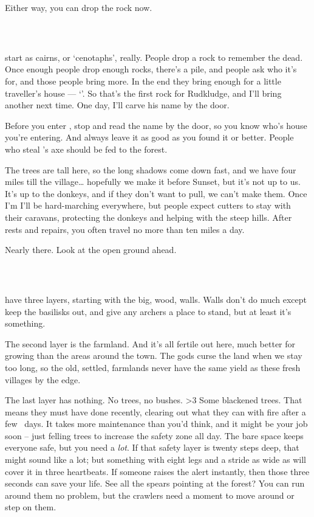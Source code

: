 Either way, you can drop the rock now.

\subsubsection{~}
start as cairns, or `cenotaphs', really.
People drop a rock to remember the dead.
Once enough people drop enough rocks, there's a pile, and people ask who it's for, and those people bring more.
In the end they bring enough for a little traveller's house --- `'.
So that's the first rock for Rudkludge, and I'll bring another next time.
One day, I'll carve his name by the door.

Before you enter , stop and read the name by the door, so you know who's house you're entering.
And always leave it as good as you found it or better.
People who steal 's axe should be fed to the forest.

The trees are tall here, so the long shadows come down fast, and we have four miles till the \gls{village}\ldots
hopefully we make it before Sunset, but it's not up to us.
It's up to the donkeys, and if they don't want to pull, we can't make them.
Once I'm  I'll be hard-marching everywhere, but people expect \glspl{cutter} to stay with their caravans, protecting the donkeys and helping with the steep hills.
After rests and repairs, you often travel no more than ten miles a day.

Nearly there.
Look at the open ground ahead.

\subsubsection*{~}
have three layers, starting with the big, wood, walls.
Walls don't do much except keep the \glspl{basilisk} out, and give any archers a place to stand, but at least it's something.

The second layer is the farmland.
And it's all fertile out here, much better for growing than the areas around the town.
The gods curse the land when we stay too long, so the old, settled, farmlands never have the same yield as these fresh \glspl{village} by the \gls{edge}.

The last layer has nothing.
No trees, no bushes.
\ifnum\thecycle>3%
  Some blackened trees.
  That means they must have done  recently, clearing out what they can with fire after a few \showTemperature\ days.
\else%
  It takes more maintenance than you'd think, and it might be your job soon -- just felling trees to increase the safety zone all day.
\fi%
The bare space keeps everyone safe, but you need a \emph{lot}.
If that safety layer is twenty \glspl{step} deep, that might sound like a lot;
but something with eight legs and a stride as wide as  will cover it in three heartbeats.
If someone raises the alert instantly, then those three seconds can save your life.
See all the spears pointing at the forest?
You can run around them no problem, but the \glspl{crawler} need a moment to move around or step on them.

